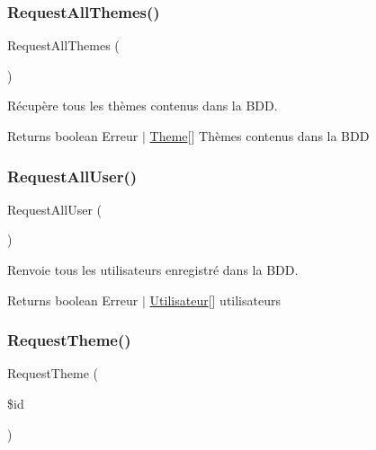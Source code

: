 \subsubsection{\texorpdfstring{Request\+All\+Themes()}{RequestAllThemes()}}
{\footnotesize\ttfamily Request\+All\+Themes (\begin{DoxyParamCaption}{ }\end{DoxyParamCaption})}



Récupère tous les thèmes contenus dans la B\+DD. 

\begin{DoxyReturn}{Returns}
boolean Erreur $\vert$ \mbox{\hyperlink{class_theme}{Theme}}\mbox{[}\mbox{]} Thèmes contenus dans la B\+DD 
\end{DoxyReturn}
\mbox{\label{class_interface_b_d_d_a3dea4aa280dafa70b190e859df68c1b4}} 
\subsubsection{\texorpdfstring{Request\+All\+User()}{RequestAllUser()}}
{\footnotesize\ttfamily Request\+All\+User (\begin{DoxyParamCaption}{ }\end{DoxyParamCaption})}



Renvoie tous les utilisateurs enregistré dans la B\+DD. 

\begin{DoxyReturn}{Returns}
boolean Erreur $\vert$ \mbox{\hyperlink{class_utilisateur}{Utilisateur}}\mbox{[}\mbox{]} utilisateurs 
\end{DoxyReturn}
\mbox{\label{class_interface_b_d_d_a03ff86215559d5aa319c416aaa5a3f46}} 
\subsubsection{\texorpdfstring{Request\+Theme()}{RequestTheme()}}
{\footnotesize\ttfamily Request\+Theme (\begin{DoxyParamCaption}\item[{}]{\$id }\end{DoxyParamCaption})}



